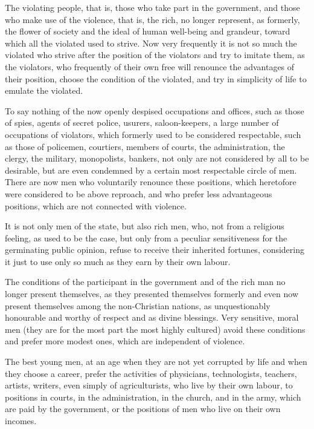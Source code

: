 \documentclass{book}
\begin{document}
The violating people, that is, those who take part in the government, and those who make use of the violence, that is, the rich, no longer represent, as formerly, the flower of society and the ideal of human well-being and grandeur, toward which all the violated used to strive. Now very frequently it is not so much the violated who strive after the position of the violators and try to imitate them, as the violators, who frequently of their own free will renounce the advantages of their position, choose the condition of the violated, and try in simplicity of life to emulate the violated.

To say nothing of the now openly despised occupations and offices, such as those of spies, agents of secret police, usurers, saloon-keepers, a large number of occupations of violators, which formerly used to be considered respectable, such as those of policemen, courtiers, members of courts, the administration, the clergy, the military, monopolists, bankers, not only are not considered by all to be desirable, but are even condemned by a certain most respectable circle of men. There are now men who voluntarily renounce these positions, which heretofore were considered to be above reproach, and who prefer less advantageous positions, which are not connected with violence.

It is not only men of the state, but also rich men, who, not from a religious feeling, as used to be the case, but only from a peculiar sensitiveness for the germinating public opinion, refuse to receive their inherited fortunes, considering it just to use only so much as they earn by their own labour.

The conditions of the participant in the government and of the rich man no longer present themselves, as they presented themselves formerly and even now present themselves among the non-Christian nations, as unquestionably honourable and worthy of respect and as divine blessings. Very sensitive, moral men (they are for the most part the most highly cultured) avoid these conditions and prefer more modest ones, which are independent of violence.

The best young men, at an age when they are not yet corrupted by life and when they choose a career, prefer the activities of physicians, technologists, teachers, artists, writers, even simply of agriculturists, who live by their own labour, to positions in courts, in the administration, in the church, and in the army, which are paid by the government, or the positions of men who live on their own incomes.
\end{document}
